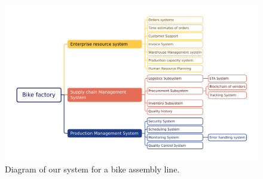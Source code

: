 \begin{figure}[H]
    \caption{Diagram of our system for a bike assembly line.}
    \centering
    \begin{sideways}
        \includegraphics[scale=0.5]{diagram.png}    
    \end{sideways}
    \label{fig:enter-label}
\end{figure}

